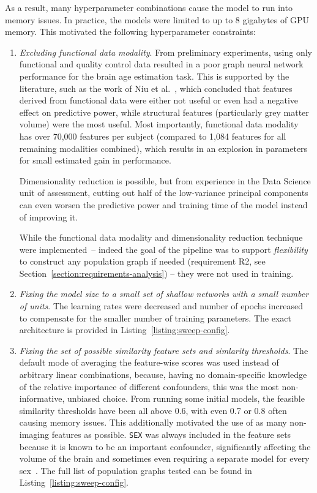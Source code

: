 As a result, many hyperparameter combinations cause the model to run into memory issues. In practice, the models were limited to up to 8 gigabytes of GPU memory. This motivated the following hyperparameter constraints:

\begin{enumerate}
    \item \textit{Excluding functional data modality}. From preliminary experiments, using only functional and quality control data resulted in a poor graph neural network performance for the brain age estimation task. This is supported by the literature, such as the work of Niu et al.~\cite{niu2019improved}, which concluded that features derived from functional data were either not useful or even had a negative effect on predictive power, while structural features (particularly grey matter volume) were the most useful. Most importantly, functional data modality has over 70,000 features per subject (compared to 1,084 features for all remaining modalities combined), which results in an explosion in parameters for small estimated gain in performance. 
    
    Dimensionality reduction is possible, but from experience in the Data Science unit of assessment, cutting out half of the low-variance principal components can even worsen the predictive power and training time of the model instead of improving it. 
    
    While the functional data modality and dimensionality reduction technique were implemented~– indeed the goal of the pipeline was to support \textit{flexibility} to construct any population graph if needed (requirement R2, see Section~\ref{section:requirements-analysis}) – they were not used in training.
    \item \textit{Fixing the model size to a small set of shallow networks with a small number of units}. The learning rates were decreased and number of epochs increased to compensate for the smaller number of training parameters. The exact architecture is provided in Listing~\ref{listing:sweep-config}.
    \item \textit{Fixing the set of possible similarity feature sets and simlarity thresholds}. The default mode of averaging the feature-wise scores was used instead of arbitrary linear combinations, because, having no domain-specific knowledge of the relative importance of different confounders, this was the most non-informative, unbiased choice. From running some initial models, the feasible similarity thresholds have been all above 0.6, with even 0.7 or 0.8 often causing memory issues. This additionally motivated the use of as many non-imaging features as possible. \texttt{SEX} was always included in the feature sets because it is known to be an important confounder, significantly affecting the volume of the brain and sometimes even requiring a separate model for every sex~\cite{kaufmann2019}. The full list of population graphs tested can be found in Listing~\ref{listing:sweep-config}.
\end{enumerate}

